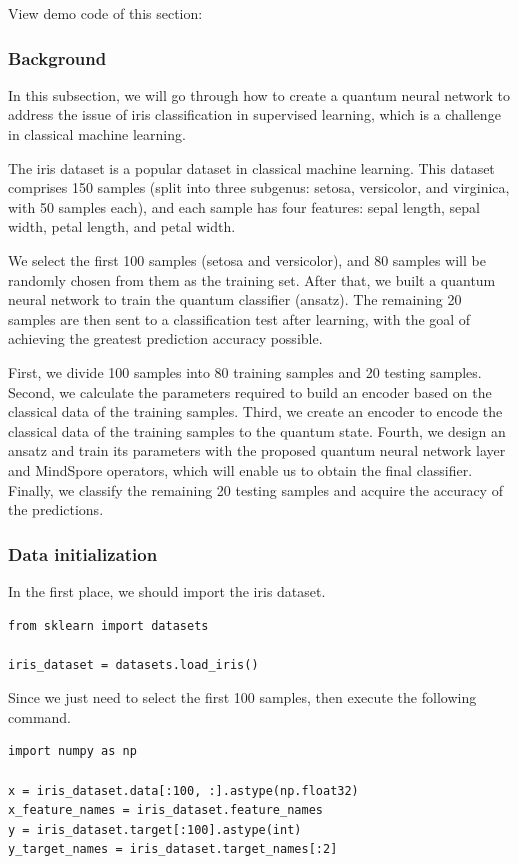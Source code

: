 View demo code of this section:  \ 
\subsubsection{Background}
In this subsection, we will go through how to create a quantum neural network to address the issue of iris classification in supervised learning, which is a challenge in classical machine learning.

The iris dataset is a popular dataset in classical machine learning. This dataset comprises 150 samples (split into three subgenus: setosa, versicolor, and virginica, with 50 samples each), and each sample has four features: sepal length, sepal width, petal length, and petal width.

We select the first 100 samples (setosa and versicolor), and 80 samples will be randomly chosen from them as the training set. After that, we built a quantum neural network to train the quantum classifier (ansatz). The remaining 20 samples are then sent to a classification test after learning, with the goal of achieving the greatest prediction accuracy possible.

First, we divide 100 samples into 80 training samples and 20 testing samples. Second, we calculate the parameters required to build an encoder based on the classical data of the training samples. Third, we create an encoder to encode the classical data of the training samples to the quantum state. Fourth, we design an ansatz and train its parameters with the proposed quantum neural network layer and MindSpore operators, which  will enable us to obtain the final classifier. Finally, we classify the remaining 20 testing samples and acquire the accuracy of the predictions.

\subsubsection{Data initialization}
In the first place, we should import the iris dataset.

\begin{lstlisting}
from sklearn import datasets

iris_dataset = datasets.load_iris()
\end{lstlisting}

Since we just need to select the first 100 samples, then execute the following command.

\begin{lstlisting}
import numpy as np

x = iris_dataset.data[:100, :].astype(np.float32)
x_feature_names = iris_dataset.feature_names
y = iris_dataset.target[:100].astype(int)
y_target_names = iris_dataset.target_names[:2]
\end{lstlisting}

